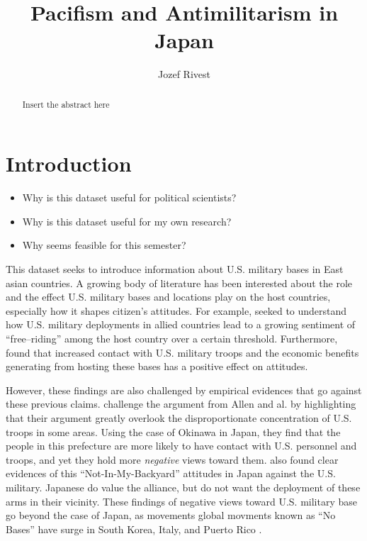 \documentclass[12pt]{article}
\title{Pacifism and Antimilitarism in Japan}
\author{Jozef Rivest}
\date{ }
\begin{document}
\maketitle

\begin{abstract}
  Insert the abstract here
\end{abstract}

\section{Introduction}

\begin{itemize}
  \item Why is this dataset useful for political scientists?
  \item Why is this dataset useful for my own research? 
  \item Why seems feasible for this semester?
\end{itemize}

This dataset seeks to introduce information about U.S. 
military bases in East asian countries. A growing body 
of literature has been interested about the role and the 
effect U.S. military bases and locations play on the host 
countries, especially how it shapes citizen's attitudes. 
For example, \cite{jakobsen_jakobsen19} seeked to understand 
how U.S. military deployments in allied countries lead to 
a growing sentiment of ``free--riding'' among the host 
country over a certain threshold. Furthermore, \cite{allen_etal20} 
found that increased contact with U.S. military troops 
and the economic benefits generating from hosting these 
bases has a positive effect on attitudes. 

However, these findings are also challenged by empirical 
evidences that go against these previous claims. 
\textcite{hikotani_etal23} challenge the argument from Allen 
and al. by highlighting that their argument greatly overlook 
the disproportionate concentration of U.S. troops in some areas.
Using the case of Okinawa in Japan, they find that the people 
in this prefecture are more likely to have contact with U.S. 
personnel and troops, and yet they hold more \textit{negative}
views toward them. \textcite{horiuchi_tago23} also found clear 
evidences of this ``Not-In-My-Backyard'' attitudes in Japan 
against the U.S. military. Japanese do value the alliance, 
but do not want the deployment of these arms in their 
vicinity. These findings of negative views toward U.S. military 
base go beyond the case of Japan, as movements global movments
known as ``No Bases'' have surge in South Korea, Italy, and 
Puerto Rico \parencite{vine19}.
\end{document}
